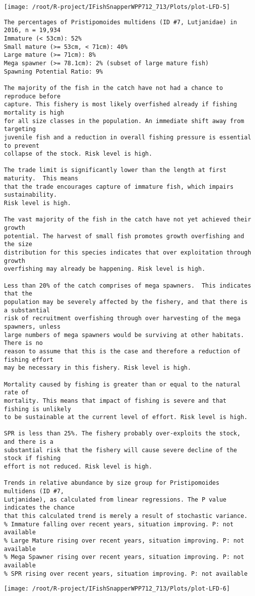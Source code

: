 \documentclass{report}\usepackage[]{graphicx}\usepackage[]{color}
\makeatletter
\def\maxwidth{ %
  \ifdim\Gin@nat@width>\linewidth
    \linewidth
  \else
    \Gin@nat@width
  \fi
}
\newenvironment{kframe}{%
 \def\at@end@of@kframe{}%
 \ifinner\ifhmode%
  \def\at@end@of@kframe{\end{minipage}}%
  \begin{minipage}{\columnwidth}%
 \fi\fi%
 \def\FrameCommand##1{\hskip\@totalleftmargin \hskip-\fboxsep
 \colorbox{shadecolor}{##1}\hskip-\fboxsep
     \hskip-\linewidth \hskip-\@totalleftmargin \hskip\columnwidth}%
 \MakeFramed {\advance\hsize-\width
   \@totalleftmargin\z@ \linewidth\hsize
   \@setminipage}}%
 {\par\unskip\endMakeFramed%
 \at@end@of@kframe}
\newenvironment{knitrout}{}{} %
\makeatother
\begin{document}
\begin{knitrout}
\texttt{[image: /root/R-project/IFishSnapperWPP712\_713/Plots/plot-LFD-5]} 
\begin{kframe}\begin{verbatim}
The percentages of Pristipomoides multidens (ID #7, Lutjanidae) in 2016, n = 19,934
Immature (< 53cm): 52%
Small mature (>= 53cm, < 71cm): 40%
Large mature (>= 71cm): 8%
Mega spawner (>= 78.1cm): 2% (subset of large mature fish)
Spawning Potential Ratio: 9%
 
The majority of the fish in the catch have not had a chance to reproduce before
capture. This fishery is most likely overfished already if fishing mortality is high
for all size classes in the population. An immediate shift away from targeting
juvenile fish and a reduction in overall fishing pressure is essential to prevent
collapse of the stock. Risk level is high.

The trade limit is significantly lower than the length at first maturity.  This means
that the trade encourages capture of immature fish, which impairs sustainability.
Risk level is high.

The vast majority of the fish in the catch have not yet achieved their growth
potential. The harvest of small fish promotes growth overfishing and the size
distribution for this species indicates that over exploitation through growth
overfishing may already be happening. Risk level is high.

Less than 20% of the catch comprises of mega spawners.  This indicates that the
population may be severely affected by the fishery, and that there is a substantial
risk of recruitment overfishing through over harvesting of the mega spawners, unless
large numbers of mega spawners would be surviving at other habitats. There is no
reason to assume that this is the case and therefore a reduction of fishing effort
may be necessary in this fishery. Risk level is high.
 
Mortality caused by fishing is greater than or equal to the natural rate of
mortality. This means that impact of fishing is severe and that fishing is unlikely
to be sustainable at the current level of effort. Risk level is high.
 
SPR is less than 25%. The fishery probably over-exploits the stock, and there is a
substantial risk that the fishery will cause severe decline of the stock if fishing
effort is not reduced. Risk level is high.
 
Trends in relative abundance by size group for Pristipomoides multidens (ID #7,
Lutjanidae), as calculated from linear regressions. The P value indicates the chance
that this calculated trend is merely a result of stochastic variance.
% Immature falling over recent years, situation improving. P: not available
% Large Mature rising over recent years, situation improving. P: not available
% Mega Spawner rising over recent years, situation improving. P: not available
% SPR rising over recent years, situation improving. P: not available
\end{verbatim}
\end{kframe}
\texttt{[image: /root/R-project/IFishSnapperWPP712\_713/Plots/plot-LFD-6]} 


\end{knitrout}
\end{document}
